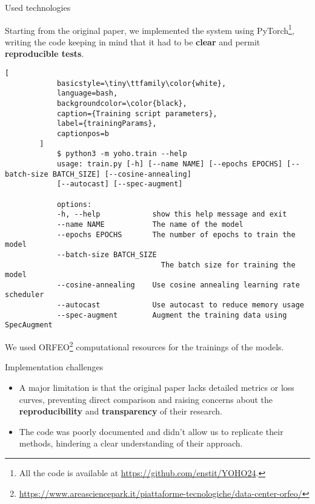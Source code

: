 	\begin{frame}[fragile]{Used technologies}
	
		Starting from the original paper, we implemented the system using PyTorch\footnote{All the code is available at
		\url{https://github.com/enstit/YOHO24}.}, writing the code keeping in mind that it had to be \textbf{clear} and
		permit \textbf{reproducible tests}.
		
		\begin{lstlisting}[
			basicstyle=\tiny\ttfamily\color{white},
			language=bash,
			backgroundcolor=\color{black},
			caption={Training script parameters},
			label={trainingParams},
			captionpos=b
		]
			$ python3 -m yoho.train --help
			usage: train.py [-h] [--name NAME] [--epochs EPOCHS] [--batch-size BATCH_SIZE] [--cosine-annealing]
			[--autocast] [--spec-augment]

			options:
			-h, --help            show this help message and exit
			--name NAME           The name of the model
			--epochs EPOCHS       The number of epochs to train the model
			--batch-size BATCH_SIZE
									The batch size for training the model
			--cosine-annealing    Use cosine annealing learning rate scheduler
			--autocast            Use autocast to reduce memory usage
			--spec-augment        Augment the training data using SpecAugment
		\end{lstlisting}

		We used ORFEO\footnote{\url{https://www.areasciencepark.it/piattaforme-tecnologiche/data-center-orfeo/}}
		computational resources for the trainings of the models.
		
	\end{frame}
	
	\begin{frame}{Implementation challenges}

	\begin{itemize}
		\item {A major limitation is that the original paper lacks detailed metrics or loss curves, preventing direct
			comparison and raising concerns about the \textbf{reproducibility} and \textbf{transparency} of their
			research.}
		\item {The code was poorly documented and didn’t allow us to replicate their methods, hindering a clear
			understanding of their approach.}
	\end{itemize}

	\end{frame}

